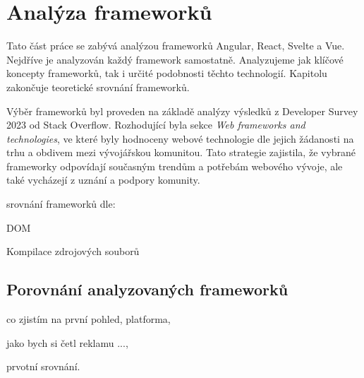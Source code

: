 \section{Analýza frameworků}

Tato část práce se zabývá analýzou frameworků Angular, React, Svelte a Vue. Nejdříve je analyzován každý framework samostatně. 
Analyzujeme jak klíčové koncepty frameworků, tak i určité podobnosti těchto technologií. Kapitolu zakončuje teoretické srovnání frameworků.

Výběr frameworků byl proveden na základě analýzy výsledků z Developer Survey 2023 od Stack Overflow. 
Rozhodující byla sekce \textit{Web frameworks and technologies}, ve které byly hodnoceny webové technologie dle jejich žádanosti na trhu a obdivem mezi vývojářskou komunitou. 
Tato strategie zajistila, že vybrané frameworky odpovídají současným trendům a potřebám webového vývoje, ale také vycházejí z uznání a podpory komunity.\cite{stackoverflow, developersurvey}

\begin{citemize}
	\item srovnání frameworků dle:
	\begin{cenumerate}
		\item DOM %
		\item Kompilace zdrojových souborů %
	\end{cenumerate}
\end{citemize}







\subsection{Porovnání analyzovaných frameworků}


\begin{citemize}
	\item co zjistím na první pohled, platforma,
	\item jako bych si četl reklamu ...,
	\item prvotní srovnání.
\end{citemize}
